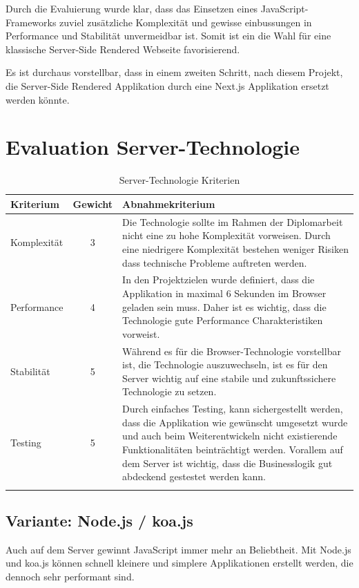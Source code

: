 Durch die Evaluierung wurde klar, dass das Einsetzen eines JavaScript-Frameworks
zuviel zusätzliche Komplexität und gewisse einbussungen in Performance und Stabilität
unvermeidbar ist. Somit ist ein die Wahl für eine klassische Server-Side Rendered
Webseite favorisierend.

Es ist durchaus vorstellbar, dass in einem zweiten Schritt, nach diesem Projekt,
die Server-Side Rendered Applikation durch eine Next.js Applikation ersetzt werden
könnte.

\clearpage
\section{Evaluation Server-Technologie}\label{evaluation-server-technologie}

\begin{longtable}[]{@{}p{2cm}cp{10cm}@{}}
  \toprule
  \textbf{Kriterium} & \textbf{Gewicht} & \textbf{Abnahmekriterium}\tabularnewline
  \midrule
  \endhead
  Komplexität        & 3                & Die Technologie sollte im Rahmen der Diplomarbeit nicht eine zu hohe Komplexität vorweisen. Durch eine niedrigere Komplexität bestehen weniger Risiken dass technische Probleme auftreten werden.\tabularnewline
  \midrule
  Performance        & 4                & In den Projektzielen wurde definiert, dass die Applikation in maximal 6 Sekunden im Browser geladen sein muss. Daher ist es wichtig, dass die Technologie gute Performance Charakteristiken vorweist.\tabularnewline
  \midrule
  Stabilität         & 5                & Während es für die Browser-Technologie vorstellbar ist, die Technologie auszuwechseln, ist es für den Server wichtig auf eine stabile und zukunftssichere Technologie zu setzen.\tabularnewline
  \midrule
  Testing            & 5                & Durch einfaches Testing, kann sichergestellt werden, dass die Applikation wie gewünscht umgesetzt wurde und auch beim Weiterentwickeln nicht existierende Funktionalitäten beinträchtigt werden. Vorallem auf dem Server ist wichtig, dass die Businesslogik gut abdeckend gestestet werden kann.\tabularnewline
  \bottomrule
  \caption{Server-Technologie Kriterien}
\end{longtable}

\subsection{Variante: Node.js / koa.js}

Auch auf dem Server gewinnt JavaScript immer mehr an Beliebtheit.
Mit Node.js und koa.js können schnell kleinere und simplere Applikationen
erstellt werden, die dennoch sehr performant sind.

